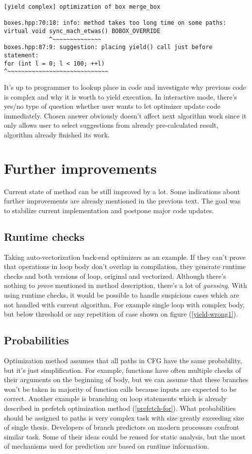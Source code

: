 \begin{verbatim}
[yield complex] optimization of box merge_box

boxes.hpp:70:18: info: method takes too long time on some paths:
virtual void sync_mach_etwas() BOBOX_OVERRIDE
             ^~~~~~~~~~~~~~~
boxes.hpp:87:9: suggestion: placing yield() call just before
statement:
for (int l = 0; l < 100; ++l)
^~~~~~~~~~~~~~~~~~~~~~~~~~~~~~
\end{verbatim}

It's up to programmer to lookup place in code and investigate why previous code is complex and  why it is worth to yield execution. In interactive mode, there's yes/no type of question whether user wants to let optimizer update code immediately. Chosen answer obviously doesn't affect next algorithm work since it only allows user to select suggestions from already pre-calculated result, algorithm already finished its work.

\section{Further improvements}
Current state of method can be still improved by a lot. Some indications about further improvements are already mentioned in the previous text. The goal was to stabilize current implementation and postpone major code updates.

\subsection{Runtime checks}
Taking auto-vectorization back-end optimizers as an example. If they can't prove that operations in loop body don't overlap in compilation, they generate runtime checks and both versions of loop, original and vectorized. Although there's nothing to \emph{prove} mentioned in method description, there's a lot of \emph{guessing}. With using runtime checks, it would be possible to handle suspicious cases which are not handled with current algorithm. For example single loop with complex body, but below threshold or any repetition of case shown on figure (\ref{yield-wrong1}).

\subsection{Probabilities}
Optimization method assumes that all paths in CFG have the same probability, but it's just simplification. For example, functions have often multiple checks of their arguments on the beginning of body, but we can assume that these branches won't be taken in majority of function calls because inputs are expected to be correct. Another example is branching on loop statements which is already described in prefetch optimization method (\ref{prefetch-for}). What probabilities should be assigned to paths is very complex task with size greatly exceeding size of single thesis. Developers of branch predictors on modern processors confront similar task. Some of their ideas could be reused for static analysis, but the most of mechanisms used for prediction are based on runtime information.

